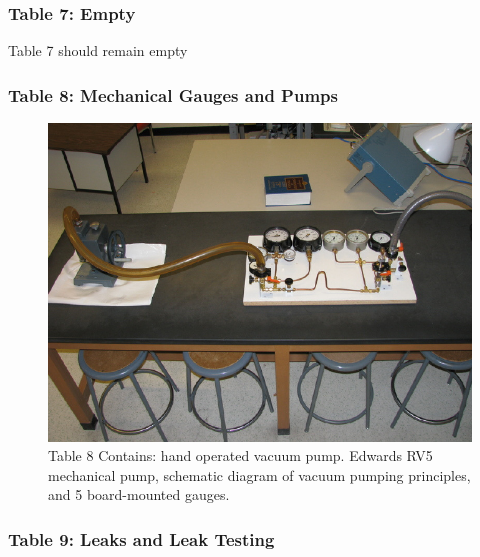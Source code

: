 \documentclass{book}
\begin{document}
\subsubsection{Table 7: Empty }
Table 7 should remain empty

\subsubsection{Table 8: Mechanical Gauges and Pumps}

\begin{figure}[H]
\includegraphics[scale=0.9]{Mechanical-Gauges-and-Pumps-Table8}
\caption[align=left]{Table 8 Contains: hand operated vacuum pump. Edwards RV5 mechanical pump, schematic diagram of vacuum pumping principles, and 5 board-mounted gauges.}
\end{figure}

\subsubsection{Table 9: Leaks and Leak Testing}
\end{document}
